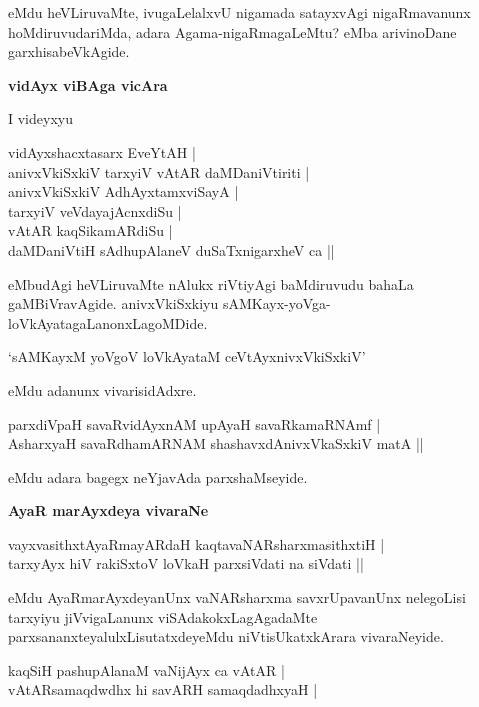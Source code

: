 \noindent
eMdu heVLiruvaMte, ivugaLelalxvU nigamada satayxvAgi nigaRmavanunx hoMdiruvudariMda, adara Agama\--nigaRmagaLeMtu? eMba arivinoDane garxhisabeVkAgide.

\newpage

{\bigskip
\noindent
{\large\bf vidAyx viBAga vicAra}}\label{page89}
\medskip

\noindent
I videyxyu 

\begin{shloka}
vidAyxshacxtasarx EveYtAH |\\
anivxVkiSxkiV tarxyiV vAtAR daMDaniVtiriti |\\
anivxVkiSxkiV AdhAyxtamxviSayA |\\\label{89}
tarxyiV veVdayajAcnxdiSu |\\
vAtAR kaqSikamARdiSu |\\
daMDaniVtiH sAdhupAlaneV duSaTxnigarxheV ca ||
\end{shloka}

\noindent
eMbudAgi heVLiruvaMte nAlukx riVtiyAgi baMdiruvudu bahaLa gaMBiVravAgide. anivxVkiSxkiyu sAMKayx\--yoVga-loVkAyatagaLanonxLagoMDide.

\begin{shloka}
`sAMKayxM yoVgoV loVkAyataM ceVtAyxnivxVkiSxkiV'\label{89}
\end{shloka}

\noindent
eMdu adanunx vivarisidAdxre.

\begin{shloka}
parxdiVpaH savaRvidAyxnAM upAyaH savaRkamaRNAmf |\\\label{89}
AsharxyaH savaRdhamARNAM shashavxdAnivxVkaSxkiV matA ||
\end{shloka}

\noindent
eMdu adara bagegx neYjavAda parxshaMseyide.

{\bigskip
\noindent
{\large\bf AyaR marAyxdeya vivaraNe}}\label{page90}
\medskip

\begin{shloka}
vayxvasithxtAyaRmayARdaH kaqtavaNARsharxmasithxtiH |\\\label{90}
tarxyAyx hiV rakiSxtoV  loVkaH parxsiVdati na siVdati ||
\end{shloka}

\noindent
eMdu AyaRmarAyxdeyanUnx vaNARsharxma savxrUpavanUnx nelegoLisi tarxyiyu jiVvigaLanunx viSAda\-kokxLa\-gAgadaMte parxsananxteyalulxLisutatxdeyeMdu niVtisUkatxkArara vivaraNeyide.

\begin{shloka}
kaqSiH pashupAlanaM vaNijAyx ca vAtAR |\\\label{90}
vAtARsamaqdwdhx hi savARH samaqdadhxyaH |\label{90}
\end{shloka}

